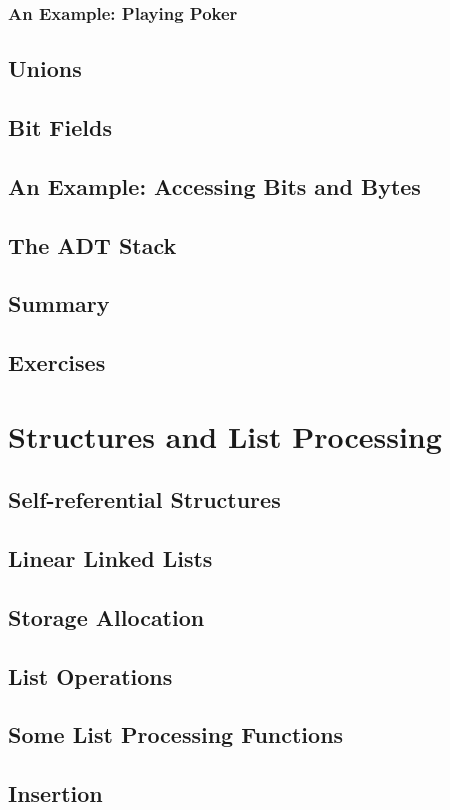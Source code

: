 \documentclass{article}
\begin{document}
\subsection{An Example: Playing Poker}
\section{Unions}
\section{Bit Fields}
\section{An Example: Accessing Bits and Bytes}
\section{The ADT Stack}
\section{Summary}
\section{Exercises}

\chapter{Structures and List Processing}

\section{Self-referential Structures}
\section{Linear Linked Lists}
\section{Storage Allocation}
\section{List Operations}
\section{Some List Processing Functions}
\section{Insertion}
\end{document}
